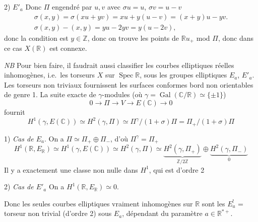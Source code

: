 \documentclass[11pt,a4paper]{article}
\begin{document}
2) \emph{$E'_{a}$} Donc $\Pi$ engendré par $u, v$ avec $\sigma u = u$,
$\sigma v = u - v$
\[
\begin{array}{l}
  \sigma(x, y) = \sigma(xu + yv) = xu + y(u - v) = (x + y) u - y v . \\
  \sigma(x, y) - (x, y) = yu - 2yv = y(u - 2v),
\end{array}
\]
donc la condition est $y \in \mathbb{Z}$, donc on trouve \struck{\ill{}} les
points de $\mathbb{R} u_{+}$ mod $\Pi$, donc dans ce cas $X(\mathbb{R})$ est
connexe.

\emph{NB} Pour bien faire, il faudrait aussi classifier les courbes elliptiques
réelles inhomogènes, i.e.\ les torseurs $X$ sur $\operatorname{Spec}
\mathbb{R}$, sous les  groupes elliptiques $E_{a}$, $E'_{a}$.
Les torseurs non triviaux fournissent les surfaces conformes 
bord non orientables de genre 1.
 La suite exacte de
$\gamma$-modules (où $\gamma = \operatorname{Gal}(\mathbb{C}/\mathbb{R})
\simeq \{\pm 1\}$)
\[
  0 \longrightarrow \Pi \longrightarrow V \longrightarrow
  E(\mathbb{C}) \longrightarrow 0
\]
fournit
\[
  H^{1}(\gamma, E(\mathbb{C})) \simeq H^{2}(\gamma, \Pi) \simeq
  \Pi^{\gamma}/(1 + \sigma)\Pi = \Pi_{+}/(1 + \sigma)\Pi
\]

1) \emph{Cas de $E_{a}$}. On a $\Pi \simeq \Pi_{+} \oplus \Pi_{-}$, d'où
$\Pi^{\gamma} = \Pi_{+}$
\[
  H^{1}(\mathbb{R}, E_{\mathbb{R}}) \simeq H^{1}(\gamma, E(\mathbb{C}))
  \simeq H^{2}(\gamma, \Pi) \simeq
  \underbrace{H^{2}(\gamma, \Pi_{+})}_{\mathbb{Z}/2\mathbb{Z}} \oplus
  \underbrace{H^{2}(\gamma, \Pi_{-})}_{0}
\]
Il y a exactement une classe non nulle dans $H^{1}$, qui est d'ordre 2

2) \emph{Cas de $E'_{a}$} On a $H^{1}(\mathbb{R}, E_{\mathbb{R}}) \simeq 0$.

Donc les seules courbes elliptiques vraiment inhomogènes sur $\mathbb{R}$ sont
les $E^{!}_{a}$ =  torseur \struck{\ill{}} non trivial (d'ordre 2) sous
$E_{a}$, dépendant du paramètre $a \in \mathbb{R}^{*+}$.
\end{document}
